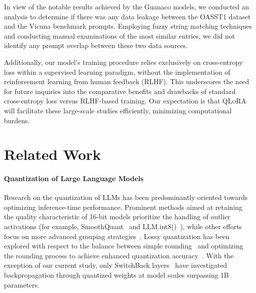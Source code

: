 In view of the notable results achieved by the {Guanaco} models, we conducted an analysis to determine if there was any data leakage between the OASST1 dataset and the Vicuna benchmark prompts. Employing fuzzy string matching techniques and conducting manual examinations of the most similar entries, we did not identify any prompt overlap between these two data sources.

Additionally, our model’s training procedure relies exclusively on cross-entropy loss within a supervised learning paradigm, without the implementation of reinforcement learning from human feedback (RLHF). This underscores the need for future inquiries into the comparative benefits and drawbacks of standard cross-entropy loss versus RLHF-based training. Our expectation is that \textsc{QLoRA} will facilitate these large-scale studies efficiently, minimizing computational burdens.

\section{Related Work}

\paragraph{Quantization of Large Language Models} Research on the quantization of LLMs has been predominantly oriented towards optimizing inference-time performance. Prominent methods aimed at retaining the quality characteristic of 16-bit models prioritize the handling of outlier activations (for example, SmoothQuant~\citep{xiao2022smoothquant} and LLM.int8()~\citep{dettmers2022llm}), while other efforts focus on more advanced grouping strategies~\citep{park2022nuqmm, yao2022zeroquant}. Lossy quantization has been explored with respect to the balance between simple rounding~\citep{dettmers2022case, zeng2022glm, pope2022efficiently} and optimizing the rounding process to achieve enhanced quantization accuracy~\citep{frantar2022gptq}. With the exception of our current study, only SwitchBack layers~\citep{wortsman2023stable} have investigated backpropagation through quantized weights at model scales surpassing 1B parameters.

